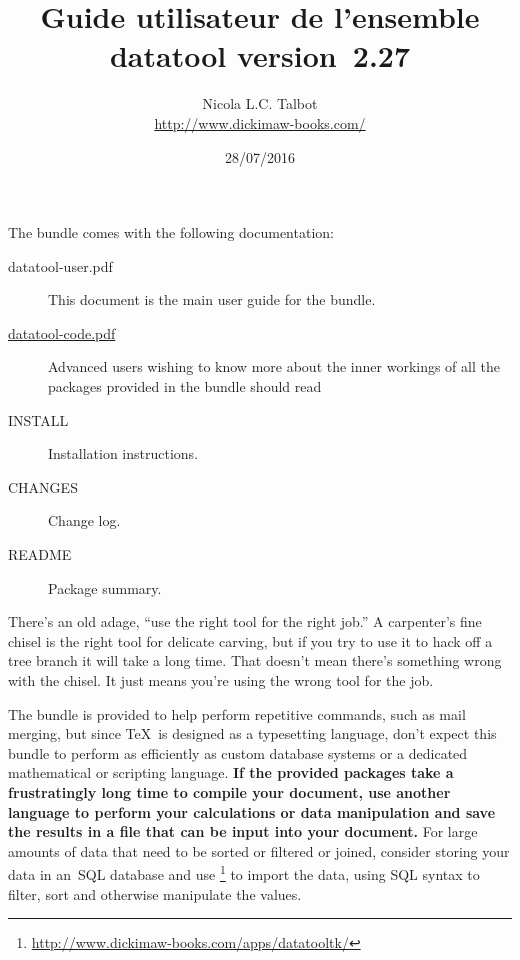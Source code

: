\documentclass[report,widecs]{nlctdoc}
\begin{document}
\raggedright
\setlength{\parindent}{1em}%


 \title{Guide utilisateur de l'ensemble datatool version~2.27}
 \author{Nicola L.C. Talbot\\
\url{http://www.dickimaw-books.com/}}

 \date{28/07/2016}
 \maketitle

\tradini
\noindent
The  bundle comes with the following documentation:
\begin{description}
  \item[datatool-user.pdf]
  This document is the main user guide for the 
  bundle.

  \item[\url{datatool-code.pdf}]
  Advanced users wishing to know more about the inner workings of
  all the packages provided in the  bundle should
  read 

  \item[INSTALL] Installation instructions.

  \item[CHANGES] Change log.

  \item[README] Package summary.
\end{description}

\begin{important}
There's an old adage, ``use the right tool for the right job.''
A carpenter's fine chisel is the right tool for delicate carving,
but if you try to use it to hack off a tree branch it will take a
long time. That doesn't mean there's something wrong with the
chisel. It just means you're using the wrong tool for the job.

The  bundle is provided to help perform repetitive
commands, such as mail merging, but since \TeX\ is designed as a
typesetting language, don't expect this bundle to perform as
efficiently as custom database systems or a dedicated mathematical
or scripting language. \textbf{If the provided packages take a frustratingly
long time to compile your document, use another language to perform
your calculations or data manipulation and save the results in a
file that can be input into your document.} For large amounts of
data that need to be sorted or filtered or joined, consider storing your data 
in an~SQL database and use
\footnote{\url{http://www.dickimaw-books.com/apps/datatooltk/}} to import the data, 
using SQL syntax to filter, sort and otherwise
manipulate the values.
\end{important}
\end{document}
